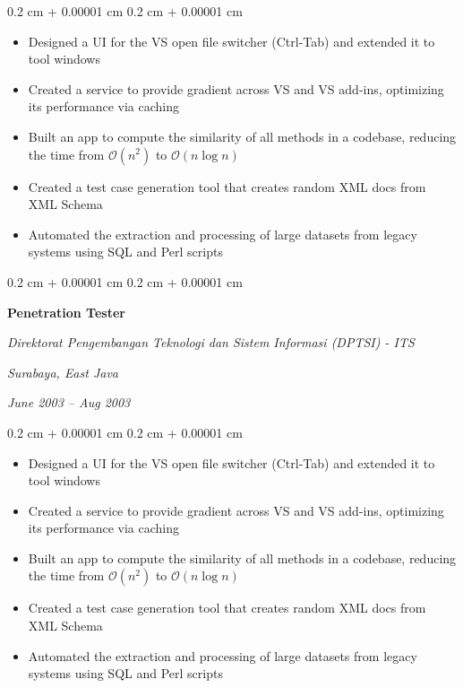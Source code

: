 \documentclass[10pt, letterpaper]{article}
\newenvironment{highlights}{
    \begin{itemize}[
        topsep=0.10 cm,
        parsep=0.10 cm,
        partopsep=0pt,
        itemsep=0pt,
        leftmargin=0.4 cm + 10pt
    ]
}{
    \end{itemize}
} %
\newenvironment{onecolentry}{
    \begin{adjustwidth}{
        0.2 cm + 0.00001 cm
    }{
        0.2 cm + 0.00001 cm
    }
}{
    \end{adjustwidth}
} %
\newenvironment{twocolentry}[2][]{
    \onecolentry
    \def\secondColumn{#2}
    \setcolumnwidth{\fill, 4.5 cm}
    \begin{paracol}{2}
}{
    \switchcolumn \raggedleft \secondColumn
    \end{paracol}
    \endonecolentry
} %
\begin{document}
        \vspace{0.10 cm}
        \begin{onecolentry}
            \begin{highlights}
                \item Designed a UI for the VS open file switcher (Ctrl-Tab) and extended it to tool windows
                \item Created a service to provide gradient across VS and VS add-ins, optimizing its performance via caching
                \item Built an app to compute the similarity of all methods in a codebase, reducing the time from $\mathcal{O}(n^2)$ to $\mathcal{O}(n \log n)$
                \item Created a test case generation tool that creates random XML docs from XML Schema
                \item Automated the extraction and processing of large datasets from legacy systems using SQL and Perl scripts
            \end{highlights}
        \end{onecolentry}

        \vspace{0.2 cm}

        \begin{twocolentry}{
        \textit{Surabaya, East Java}    
            
        \textit{June 2003 – Aug 2003}}
            \textbf{Penetration Tester}
            
            \textit{Direktorat Pengembangan Teknologi dan Sistem Informasi (DPTSI) - ITS}
        \end{twocolentry}

        \vspace{0.10 cm}
        \begin{onecolentry}
            \begin{highlights}
                \item Designed a UI for the VS open file switcher (Ctrl-Tab) and extended it to tool windows
                \item Created a service to provide gradient across VS and VS add-ins, optimizing its performance via caching
                \item Built an app to compute the similarity of all methods in a codebase, reducing the time from $\mathcal{O}(n^2)$ to $\mathcal{O}(n \log n)$
                \item Created a test case generation tool that creates random XML docs from XML Schema
                \item Automated the extraction and processing of large datasets from legacy systems using SQL and Perl scripts
            \end{highlights}
        \end{onecolentry}
\end{document}
